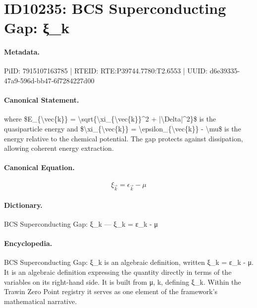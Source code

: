 \section*{ID10235: BCS Superconducting Gap: ξ\_k}
\paragraph{Metadata.}
PiID: 7915107163785 | RTEID: RTE:P39744.7780:T2.6553 | UUID: d6e39335-47a9-596d-bb47-6f7284227d00

\paragraph{Canonical Statement.}
where \$E\_\{\textbackslash{}vec\{k\}\} = \textbackslash{}sqrt\{\textbackslash{}xi\_\{\textbackslash{}vec\{k\}\}\textasciicircum{}2 + |\textbackslash{}Delta|\textasciicircum{}2\}\$ is the quasiparticle energy and \$\textbackslash{}xi\_\{\textbackslash{}vec\{k\}\} = \textbackslash{}epsilon\_\{\textbackslash{}vec\{k\}\} - \textbackslash{}mu\$ is the energy relative to the chemical potential. The gap protects against dissipation, allowing coherent energy extraction.

\paragraph{Canonical Equation.}
\[
\xi_{\vec{k}} = \epsilon_{\vec{k}} - \mu
\]

\paragraph{Dictionary.}
BCS Superconducting Gap: ξ\_k — ξ\_k = ε\_k - μ

\paragraph{Encyclopedia.}
BCS Superconducting Gap: ξ\_k is an algebraic definition, written ξ\_k = ε\_k - μ. It is an algebraic definition expressing the quantity directly in terms of the variables on its right-hand side. It is built from μ, k, defining ξ\_k. Within the Trawin Zero Point registry it serves as one element of the framework's mathematical narrative.

